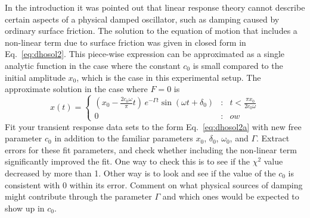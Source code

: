 \documentclass{revtex4}
\begin{document}
In the introduction it was pointed out that linear response theory cannot
describe certain aspects of a physical damped oscillator, such as damping
caused by ordinary surface friction.  The solution to the equation of 
motion that includes a non-linear term due to surface friction was given
in closed form in Eq.~\ref{eq:dhosol2}.  This piece-wise expression can
be approximated as a single analytic function in the case where the constant
$c_0$ is small compared to the initial amplitude $x_0$, which is the case
in this experimental setup.  The approximate solution in the case where
$F=0$ is
\begin{equation}
x(t) = \left\{\begin{array}{lll}
\left(x_0-\frac{2c_0\omega}{\pi}t\right)\,
e^{-\Gamma t}\sin(\omega t + \delta_0) &:& t<\frac{\pi x_0}{2c_0\omega} \\
0 &:& ow
\end{array} \right.
\label{eq:dhosol2a}
\end{equation}
Fit your transient response data sets to the form Eq.~\ref{eq:dhosol2a}
with new free parameter $c_0$ in addition to the familiar parameters
$x_0$, $\delta_0$, $\omega_0$, and $\Gamma$.  Extract errors for these
fit parameters, and check whether including the non-linear term significantly
improved the fit.  One way to check this is to see if the $\chi^2$ value
decreased by more than 1.  Other way is to look and see if the value of
the $c_0$ is consistent with 0 within its error.  Comment on what physical
sources of damping might contribute through the parameter $\Gamma$ and
which ones would be expected to show up in $c_0$.

\end{document}
